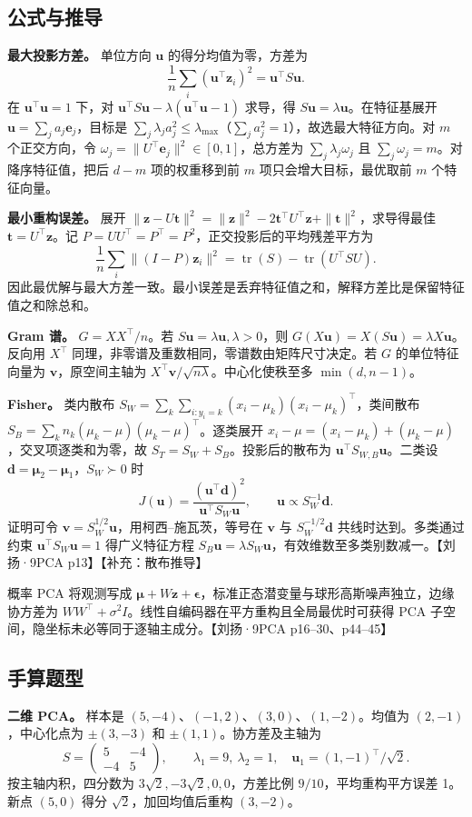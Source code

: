 \documentclass[UTF8,a4paper,zihao=-4,fontset=fandol]{ctexart}
\begin{document}
\subsection{公式与推导}
\textbf{最大投影方差。} 单位方向 \(\bm u\) 的得分均值为零，方差为
\[
 \frac1n\sum_i(\bm u^\top\bm z_i)^2=\bm u^\top S\bm u .
\]
在 \(\bm u^\top\bm u=1\) 下，对 \(\bm u^\top S\bm u-\lambda(\bm u^\top\bm u-1)\) 求导，得 \(S\bm u=\lambda\bm u\)。在特征基展开 \(\bm u=\sum_j a_j\bm e_j\)，目标是 \(\sum_j\lambda_ja_j^2\le\lambda_{\max}\)（\(\sum_j a_j^2=1\)），故选最大特征方向。对 \(m\) 个正交方向，令 \(\omega_j=\|U^\top\bm e_j\|^2\in[0,1]\)，总方差为 \(\sum_j\lambda_j\omega_j\) 且 \(\sum_j\omega_j=m\)。对降序特征值，把后 \(d-m\) 项的权重移到前 \(m\) 项只会增大目标，最优取前 \(m\) 个特征向量。
 
\textbf{最小重构误差。} 展开 \(\|\bm z-U\bm t\|^2=\|\bm z\|^2-2\bm t^\top U^\top\bm z+\|\bm t\|^2\)，求导得最佳 \(\bm t=U^\top\bm z\)。记 \(P=UU^\top=P^\top=P^2\)，正交投影后的平均残差平方为
\[
 \frac1n\sum_i\|(I-P)\bm z_i\|^2=\operatorname{tr}(S)-\operatorname{tr}(U^\top SU).
\]
因此最优解与最大方差一致。最小误差是丢弃特征值之和，解释方差比是保留特征值之和除总和。
 
\textbf{Gram 谱。} \(G=XX^\top/n\)。若 \(S\bm u=\lambda\bm u,\lambda>0\)，则 \(G(X\bm u)=X(S\bm u)=\lambda X\bm u\)。反向用 \(X^\top\) 同理，非零谱及重数相同，零谱数由矩阵尺寸决定。若 \(G\) 的单位特征向量为 \(\bm v\)，原空间主轴为 \(X^\top\bm v/\sqrt{n\lambda}\)。中心化使秩至多 \(\min(d,n-1)\)。
 
\textbf{Fisher。} 类内散布 \(S_W=\sum_{k}\sum_{i:y_i=k}(x_i-\mu_k)(x_i-\mu_k)^\top\)，类间散布 \(S_B=\sum_k n_k(\mu_k-\mu)(\mu_k-\mu)^\top\)。逐类展开 \(x_i-\mu=(x_i-\mu_k)+(\mu_k-\mu)\)，交叉项逐类和为零，故 \(S_T=S_W+S_B\)。投影后的散布为 \(\bm u^\top S_{W,B}\bm u\)。二类设 \(\bm d=\bm\mu_2-\bm\mu_1\)，\(S_W\succ0\) 时
\[
 J(\bm u)=\frac{(\bm u^\top\bm d)^2}{\bm u^\top S_W\bm u},
 \qquad \bm u\propto S_W^{-1}\bm d .
\]
证明可令 \(\bm v=S_W^{1/2}\bm u\)，用柯西--施瓦茨，等号在 \(\bm v\) 与 \(S_W^{-1/2}\bm d\) 共线时达到。多类通过约束 \(\bm u^\top S_W\bm u=1\) 得广义特征方程 \(S_B\bm u=\lambda S_W\bm u\)，有效维数至多类别数减一。【刘扬·9PCA p13】【补充：散布推导】
 
概率 PCA 将观测写成 \(\bm\mu+W\bm z+\bm\epsilon\)，标准正态潜变量与球形高斯噪声独立，边缘协方差为 \(WW^\top+\sigma^2I\)。线性自编码器在平方重构且全局最优时可获得 PCA 子空间，隐坐标未必等同于逐轴主成分。【刘扬·9PCA p16--30、p44--45】

\subsection{手算题型}
\textbf{二维 PCA。} 样本是 \((5,-4)\)、\((-1,2)\)、\((3,0)\)、\((1,-2)\)。均值为 \((2,-1)\)，中心化点为 \(\pm(3,-3)\) 和 \(\pm(1,1)\)。协方差及主轴为
\[
 S=\begin{pmatrix}5&-4\\-4&5\end{pmatrix},
 \qquad \lambda_1=9,\ \lambda_2=1,\quad
 \bm u_1=(1,-1)^\top/\sqrt 2 .
\]
按主轴内积，四分数为 \(3\sqrt2,-3\sqrt2,0,0\)，方差比例 \(9/10\)，平均重构平方误差 1。新点 \((5,0)\) 得分 \(\sqrt2\)，加回均值后重构 \((3,-2)\)。
 
\end{document}
